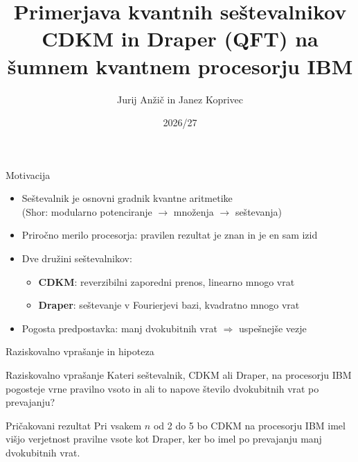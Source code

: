 \documentclass[aspectratio=169,11pt]{beamer}
\title[Seštevalnika CDKM in Draper]{Primerjava kvantnih seštevalnikov CDKM in Draper (QFT) na šumnem kvantnem procesorju IBM}
\author{Jurij Anžič in Janez Koprivec}
\institute{Skupina 08 \\ Nekonvencionalne platforme in metode procesiranja}
\date{2026/27}
\begin{document}
\maketitle

\begin{frame}{Motivacija}
\begin{itemize}
  \item Seštevalnik je osnovni gradnik kvantne aritmetike \\
        {\small (Shor: modularno potenciranje $\rightarrow$ množenja $\rightarrow$ seštevanja)}
  \item Priročno merilo procesorja: pravilen rezultat je znan in je en sam izid
  \item Dve družini seštevalnikov:
  \begin{itemize}
    \item \textbf{CDKM}: reverzibilni zaporedni prenos, linearno mnogo vrat
    \item \textbf{Draper}: seštevanje v Fourierjevi bazi, kvadratno mnogo vrat
  \end{itemize}
  \item Pogosta predpostavka: \alert{manj dvokubitnih vrat $\Rightarrow$ uspešnejše vezje}
\end{itemize}
\end{frame}

\begin{frame}{Raziskovalno vprašanje in hipoteza}
\begin{block}{Raziskovalno vprašanje}
Kateri seštevalnik, CDKM ali Draper, na procesorju IBM pogosteje vrne pravilno vsoto in ali to napove število dvokubitnih vrat po prevajanju?
\end{block}
\vspace{0.4cm}
\begin{block}{Pričakovani rezultat}
Pri vsakem $n$ od 2 do 5 bo CDKM na procesorju IBM imel višjo verjetnost pravilne vsote kot Draper, ker bo imel po prevajanju manj dvokubitnih vrat.
\end{block}
\end{frame}
\end{document}
